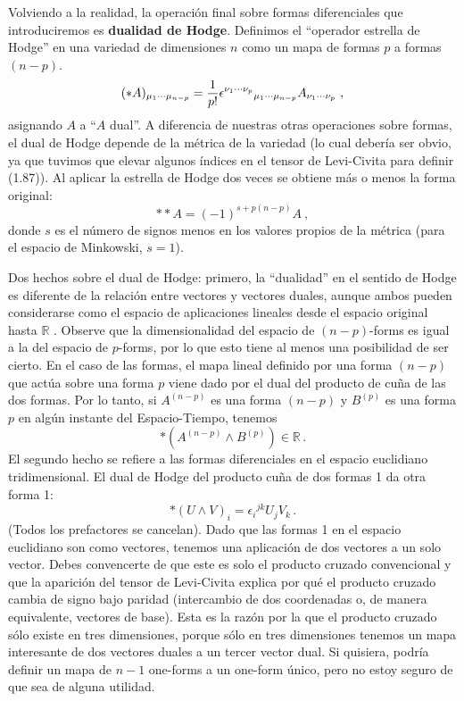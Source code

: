 \documentclass[11pt,b5paper,openany,twoside]{book}
\begin{document}
Volviendo a la realidad, la operación final sobre formas diferenciales que introduciremos es {\bf dualidad de Hodge}.
Definimos el ``operador estrella de Hodge'' en una variedad de dimensiones $n$ como un mapa de formas $p$ a formas $(n-p)$.
\begin{equation}
(*A)_{\mu_1\cdots\mu_{n-p}} = {1\over {p!}}
\epsilon^{\nu_1\cdots\nu_p}{}_{\mu_1\cdots\mu_{n-p}}
A_{\nu_1\cdots\nu_p}\ ,\label{1.87}
\end{equation}
asignando $A$ a ``$A$ dual''.
A diferencia de nuestras otras operaciones sobre formas, el dual de Hodge depende de la métrica de la variedad (lo cual debería ser obvio, ya que tuvimos que elevar algunos índices en el tensor de Levi-Civita para definir (1.87)).
Al aplicar la estrella de Hodge dos veces se obtiene más o menos la forma original:
\begin{equation}
**A = (-1)^{s+p(n-p)}A\ ,\label{1.88}
\end{equation}
donde $s$ es el número de signos menos en los valores propios de la métrica (para el espacio de Minkowski, $s=1$).

Dos hechos sobre el dual de Hodge: primero, la ``dualidad'' en el sentido de Hodge es diferente de la relación entre vectores y vectores duales, aunque ambos pueden considerarse como el espacio de aplicaciones lineales desde el espacio original hasta $\mathbb{R}$ .
Observe que la dimensionalidad del espacio de $(n-p)$-forms es igual a la del espacio de $p$-forms, por lo que esto tiene al menos una posibilidad de ser cierto.
En el caso de las formas, el mapa lineal definido por una forma $(n-p)$ que actúa sobre una forma $p$ viene dado por el dual del producto de cuña de las dos formas.
Por lo tanto, si $A^{(n-p)}$ es una forma $(n-p)$ y $B^{(p)}$ es una forma $p$ en algún instante del Espacio-Tiempo, tenemos
\begin{equation}
*(A^{(n-p)}\wedge B^{(p)}) \in \mathbb{R}\,.\label{1.89}
\end{equation}
El segundo hecho se refiere a las formas diferenciales en el espacio euclidiano tridimensional.
El dual de Hodge del producto cuña de dos formas 1 da otra forma 1:
\begin{equation}
*(U\wedge V)_i = \epsilon_i{}^{jk}U_j V_k\,.\label{1.90}
\end{equation}
(Todos los prefactores se cancelan).
Dado que las formas 1 en el espacio euclidiano son como vectores, tenemos una aplicación de dos vectores a un solo vector.
Debes convencerte de que este es solo el producto cruzado convencional y que la aparición del tensor de Levi-Civita explica por qué el producto cruzado cambia de signo bajo paridad (intercambio de dos coordenadas o, de manera equivalente, vectores de base).
Esta es la razón por la que el producto cruzado sólo existe en tres dimensiones, porque sólo en tres dimensiones tenemos un mapa interesante de dos vectores duales a un tercer vector dual.
Si quisiera, podría definir un mapa de $n-1$ one-forms a un one-form único, pero no estoy seguro de que sea de alguna utilidad.
\end{document}

